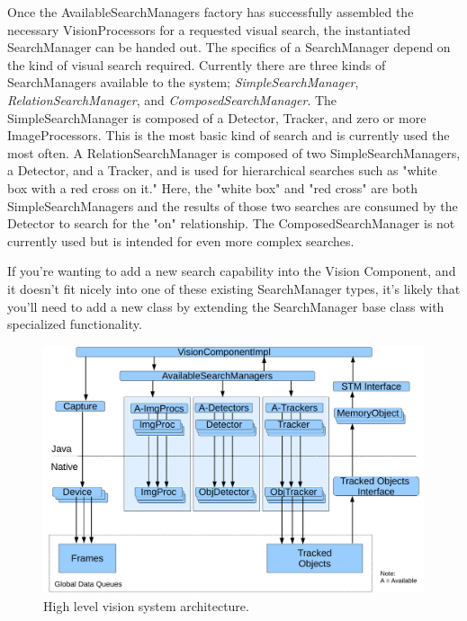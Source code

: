 \documentclass{article}
\begin{document}
Once the AvailableSearchManagers factory has successfully assembled
the necessary VisionProcessors for a requested visual search, the instantiated SearchManager can
be handed out. The specifics of a SearchManager depend on the kind
of visual search required. Currently there are three kinds of SearchManagers
available to the system; {\em SimpleSearchManager}, {\em RelationSearchManager}, 
and {\em ComposedSearchManager}. The SimpleSearchManager is composed of a
Detector, Tracker, and zero or more ImageProcessors. This is the most basic
kind of search and is currently used the most often. A RelationSearchManager
is composed of two SimpleSearchManagers, a Detector, and a Tracker,
and is used for hierarchical searches such as "white box with a red
cross on it." Here, the "white box" and "red cross" are both
SimpleSearchManagers and the results of those two searches are consumed
by the Detector to search for the "on" relationship. The ComposedSearchManager
is not currently used but is intended for even more complex searches.

If you're wanting to add a new search capability into the Vision Component,
and it doesn't fit nicely into one of these existing SearchManager types,
it's likely that you'll need to add a new class by extending the SearchManager
base class with specialized functionality.

\begin{figure}[t]
  \centering
  \includegraphics[width=7.0in]{vision_arch.pdf}
  \caption{High level vision system architecture.}
  \label{fig:vis_arch}
\end{figure}
\end{document}
